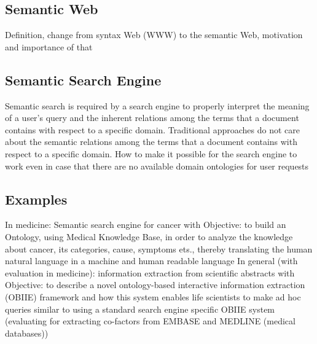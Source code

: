 		\subsection{Semantic Web}
		Definition, change from syntax Web (WWW) to the semantic Web, motivation and importance of that \cite{Ber01}
		\subsection{Semantic Search Engine}
		Semantic search is required by a search engine to properly interpret the meaning of a user's query and the inherent relations among the terms that a document contains with respect to a specific domain. Traditional approaches do not care about the semantic relations among the terms that a document contains with respect to a specific domain.
		How to make it possible for the search engine to work even in case that there are no available domain ontologies for user requests \cite{Fang05}
		\subsection{Examples}
		In medicine: Semantic search engine for cancer \cite{Raj14} with Objective: \newline
		 to build an Ontology, using Medical Knowledge Base, in order to analyze the knowledge about cancer, its categories, cause, symptoms ets., thereby translating the human natural language in a machine and human readable language \newline \newline
		In general (with evaluation in medicine): information extraction from scientific abstracts \cite{Mil05} with Objective: \newline
		to describe a novel ontology-based interactive information extraction (OBIIE) framework and how this system enables life scientists to make
		ad hoc queries similar to using a standard search engine
		specific OBIIE system (evaluating  for extracting
		co-factors from EMBASE and MEDLINE (medical databases))
